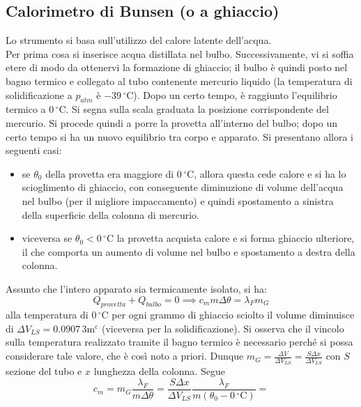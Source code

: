 \documentclass[10pt, oneside]{book}
\newcommand{\celsius}{\, \mathrm{{}^\circ C}}
\newcommand{\meters}[2]{\, \mathrm{#2 m^{#1}}}
\newcommand{\ds}{\displaystyle}
\begin{document}
\subsection{Calorimetro di Bunsen (o a ghiaccio)}
Lo strumento si basa sull'utilizzo del calore latente dell'acqua.\\
Per prima cosa si inserisce acqua distillata nel bulbo. Successivamente, vi si soffia etere di modo da ottenervi la formazione di ghiaccio; il bulbo è quindi posto nel bagno termico e collegato al tubo contenente mercurio liquido (la temperatura di solidificazione a $p_{atm}$ è $-39 \celsius$). Dopo un certo tempo, è raggiunto l'equilibrio termico a $0 \celsius$. Si segna sulla scala graduata la posizione corrispondente del mercurio. Si procede quindi a porre la provetta all'interno del bulbo; dopo un certo tempo si ha un nuovo equilibrio tra corpo e apparato. Si presentano allora i seguenti casi:
\begin{itemize}
\item se $\theta_0$ della provetta era maggiore di $0 \celsius$, allora questa cede calore e si ha lo scioglimento di ghiaccio, con conseguente diminuzione di volume dell'acqua nel bulbo (per il migliore impaccamento) e quindi spostamento a sinistra della superficie della colonna di mercurio.
\item viceversa se $\theta_0 < 0 \celsius$ la provetta acquista calore e si forma ghiaccio ulteriore, il che comporta un aumento di volume nel bulbo e spostamento a destra della colonna.
\end{itemize}
Assunto che l'intero apparato sia termicamente isolato, si ha:
\[Q_{provetta} + Q_{bulbo} = 0 \implies c_m m \Delta \theta = \lambda_F m_G\]
alla temperatura di $0 \celsius$ per ogni grammo di ghiaccio sciolto il volume diminuisce di $\Delta V_{LS} = 0.0907 \meters{c}{3}$ (viceversa per la solidificazione). Si osserva che il vincolo sulla temperatura realizzato tramite il bagno termico è necessario perché si possa considerare tale valore, che è così noto a priori. Dunque $\ds m_G = \frac{\Delta V}{\Delta V_{LS}} = \frac{S \Delta x}{\Delta V_{LS}}$ con $S$ sezione del tubo e $x$ lunghezza della colonna. Segue
\[c_m = m_G \frac{\lambda_F}{m \Delta \theta} = \frac{S \Delta x}{\Delta V_{LS}} \frac{\lambda_F}{m (\theta_0 - 0 \celsius)} = \]
\end{document}
